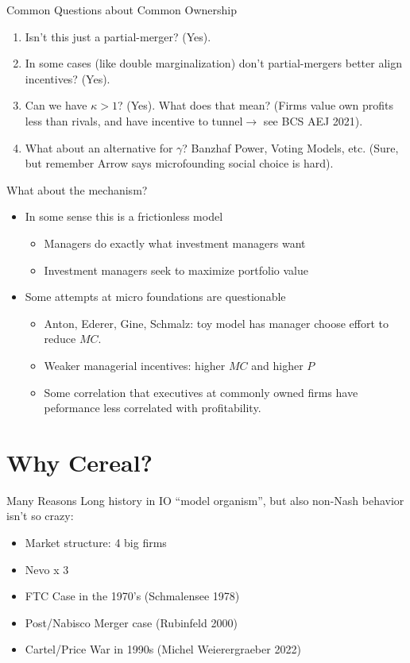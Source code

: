 \begin{frame}[plain]{Common Questions about Common Ownership}
\begin{enumerate}
\item Isn't this just a partial-merger? (Yes).
\item In some cases (like double marginalization) don't partial-mergers better align incentives? (Yes).
\item Can we have $\kappa > 1$? (Yes). What does that mean? (Firms value own profits less than rivals, and have incentive to \alert{tunnel}$\rightarrow$ see BCS AEJ 2021).
\item What about an alternative for $\gamma$? Banzhaf Power, Voting Models, etc. (Sure, but remember Arrow says microfounding social choice is hard).
\end{enumerate}
 \end{frame}




\begin{frame}[plain]{What about the mechanism?}
\begin{itemize}
\item In some sense this is a \alert{frictionless} model
\begin{itemize}
  \item Managers do exactly what investment managers want
  \item Investment managers seek to maximize \alert{portfolio value}
\end{itemize}
\item Some attempts at micro foundations are questionable
\begin{itemize}
  \item Anton, Ederer, Gine, Schmalz: toy model has manager choose effort to reduce $MC$.
  \item Weaker managerial incentives: higher $MC$ and higher $P$
  \item Some correlation that executives at commonly owned firms have peformance less correlated with profitability.
\end{itemize}
\end{itemize}
 \end{frame}




\section{Why Cereal?}

\begin{frame}{Many Reasons}
Long history in IO ``model organism'', but also non-Nash behavior isn't so crazy:
\begin{itemize}
\item Market structure: 4 big firms
\item Nevo x 3
\item FTC Case in the 1970's (Schmalensee 1978)
\item Post/Nabisco Merger case (Rubinfeld 2000)
\item Cartel/Price War in 1990s (Michel Weierergraeber 2022)
\end{itemize}
\end{frame}


